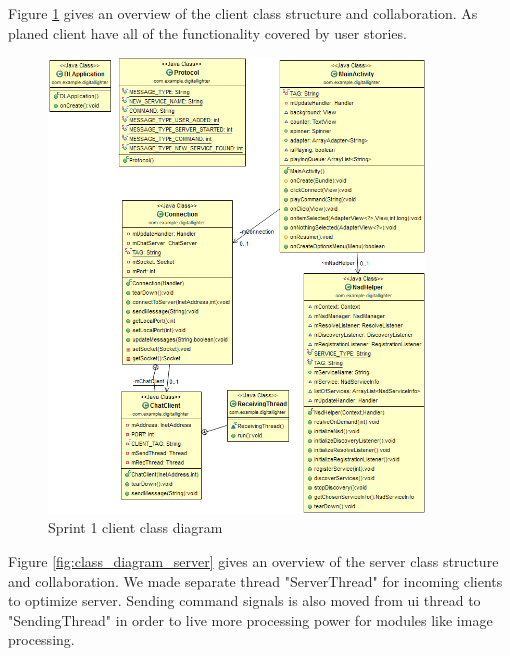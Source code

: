 Figure \ref{fig:class_diagram_client} gives an overview of the client class structure and collaboration. As planed client have all of the functionality covered by user stories. 

\begin{figure}[H]
	\centering
		\includegraphics[width=10cm]{sprint1/class_diagram_client.png}
	\caption{Sprint 1 client class diagram}
	\label{fig:class_diagram_client}
\end{figure}

Figure \ref{fig:class_diagram_server} gives an overview of the server class structure and collaboration. We made separate thread "ServerThread" for incoming clients to optimize server. Sending command signals is also moved from ui thread to "SendingThread" in order to live more processing power for modules like image processing.

